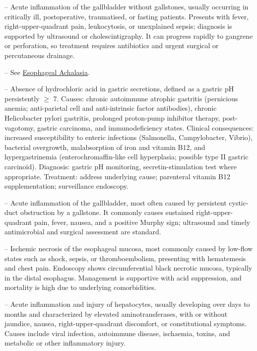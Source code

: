 -- Acute inflammation of the gallbladder without gallstones, usually occurring in critically ill, postoperative, traumatised, or fasting patients. Presents with fever, right-upper-quadrant pain, leukocytosis, or unexplained sepsis; diagnosis is supported by ultrasound or cholescintigraphy. It can progress rapidly to gangrene or perforation, so treatment requires antibiotics and urgent surgical or percutaneous drainage.

-- See \hyperlink{Esophageal Achalasia}{Esophageal Achalasia}.

-- Absence of hydrochloric acid in gastric secretions, defined as a gastric pH persistently $\ge$ 7. Causes: chronic autoimmune atrophic gastritis (pernicious anemia; anti-parietal cell and anti-intrinsic factor antibodies), chronic Helicobacter pylori gastritis, prolonged proton-pump inhibitor therapy, post-vagotomy, gastric carcinoma, and immunodeficiency states. Clinical consequences: increased susceptibility to enteric infections (Salmonella, Campylobacter, Vibrio), bacterial overgrowth, malabsorption of iron and vitamin B12, and hypergastrinemia (enterochromaffin-like cell hyperplasia; possible type II gastric carcinoid). Diagnosis: gastric pH monitoring, secretin-stimulation test where appropriate. Treatment: address underlying cause; parenteral vitamin B12 supplementation; surveillance endoscopy.

-- Acute inflammation of the gallbladder, most often caused by persistent cystic-duct obstruction by a gallstone. It commonly causes sustained right-upper-quadrant pain, fever, nausea, and a positive Murphy sign; ultrasound and timely antimicrobial and surgical assessment are standard.

-- Ischemic necrosis of the esophageal mucosa, most commonly caused by low-flow states such as shock, sepsis, or thromboembolism, presenting with hematemesis and chest pain. Endoscopy shows circumferential black necrotic mucosa, typically in the distal esophagus. Management is supportive with acid suppression, and mortality is high due to underlying comorbidities.

-- Acute inflammation and injury of hepatocytes, usually developing over days to months and characterized by elevated aminotransferases, with or without jaundice, nausea, right-upper-quadrant discomfort, or constitutional symptoms. Causes include viral infection, autoimmune disease, ischaemia, toxins, and metabolic or other inflammatory injury.

